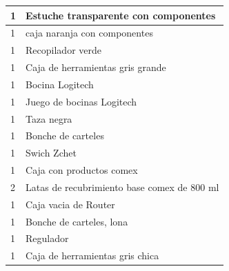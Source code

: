 \documentclass[a4paper,11pt]{article}                 %
\begin{document}
\begin{longtable}{|p{}|p{}|}
    1        & Estuche transparente con componentes               \\ \hline
    1        & caja naranja con componentes                       \\ \hline
    1        & Recopilador verde                                  \\ \hline
    1        & Caja de herramientas gris grande                   \\ \hline
    1        & Bocina Logitech                                    \\ \hline
    1        & Juego de bocinas Logitech                          \\ \hline
    1        & Taza negra                                         \\ \hline
    1        & Bonche de carteles                                 \\ \hline
    1        & Swich Zchet                                        \\ \hline
    1        & Caja con productos comex                           \\ \hline
    2        & Latas de recubrimiento base comex de 800 ml        \\ \hline
    1        & Caja vacia de Router                               \\ \hline
    1        & Bonche de carteles, lona                           \\ \hline
    1        & Regulador                                          \\ \hline
    1        & Caja de herramientas gris chica                    \\ \hline
    \end{longtable}
\end{document}
